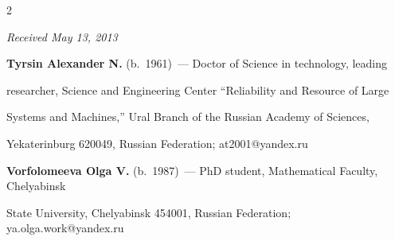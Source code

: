 \begin{multicols}{2}
{{

} }







\end{multicols}



\hfill{\small \textit{Received May 13, 2013}}











\Contr



\noindent

\textbf{Tyrsin Alexander N.} (b.\ 1961)~--- Doctor of Science in technology, leading 

researcher, Science and Engineering Center ``Reliability and Resource of Large 

Systems and Machines,'' Ural Branch of the Russian Academy of Sciences, 

Yekaterinburg 620049, Russian Federation; at2001@yandex.ru



\vspace*{3pt}

 \label{end\stat}



\noindent

\textbf{Vorfolomeeva Olga V.} (b.\ 1987)~--- PhD student, Mathematical Faculty, Chelyabinsk 

State University, Chelyabinsk 454001, Russian Federation; ya.olga.work@yandex.ru



\renewcommand{\bibname}{\protect\rm Литература}

   

